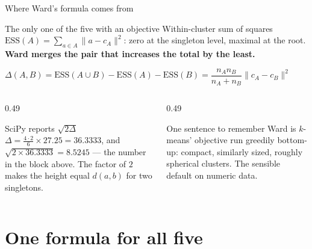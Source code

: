 \documentclass[aspectratio=169]{beamer}
\begin{document}
\begin{frame}[shrink=10]{Where Ward's formula comes from}
  \begin{block}{The only one of the five with an objective}
    \small Within-cluster sum of squares
    $\mathrm{ESS}(A) = \sum_{a \in A}\lVert a - c_A\rVert^2$: zero at the
    singleton level, maximal at the root. \textbf{Ward merges the pair that
    increases the total by the least.}
  \end{block}
  \begin{exampleblock}{}
    \centering\large
    $\Delta(A,B) = \mathrm{ESS}(A \cup B) - \mathrm{ESS}(A) - \mathrm{ESS}(B)
     = \dfrac{n_A n_B}{n_A + n_B}\lVert c_A - c_B\rVert^2$
  \end{exampleblock}
  \begin{columns}[T]
    \begin{column}{0.49\textwidth}
      \begin{block}{SciPy reports $\sqrt{2\Delta}$}
        \small
        $\Delta = \frac{4 \cdot 2}{6}\times 27.25 = 36.3333$, and
        $\sqrt{2 \times 36.3333} = \mathbf{8.5245}$ --- the number in the
        block above. The factor of $2$ makes the height equal $d(a,b)$ for two
        singletons.
      \end{block}
    \end{column}
    \begin{column}{0.49\textwidth}
      \begin{alertblock}{One sentence to remember}
        \small Ward is $k$-means' objective run greedily bottom-up: compact,
        similarly sized, roughly spherical clusters. The sensible default on
        numeric data.
      \end{alertblock}
    \end{column}
  \end{columns}
\end{frame}

\section[Lance--Williams]{One formula for all five}
\label{sec:lw}
\end{document}

